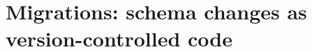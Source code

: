 \chapter{Migrations: schema changes as version-controlled code}
\label{ch:migrations-schema-changes-as-version}

